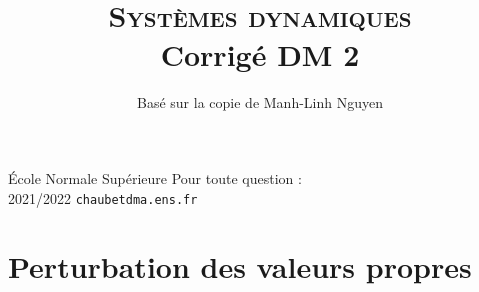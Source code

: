 \documentclass[french, 12pt]{article}
\title{\textsc{Syst\`emes dynamiques} \\Corrig\'e DM 2}
\date{}
\author{\Large Bas\'e sur la copie de Manh-Linh Nguyen}
\theoremstyle{definition}
\begin{document}
{\noindent \'Ecole Normale Sup\'erieure  \hfill Pour toute question :}
\\
{2021/2022 \hfill \hfill \texttt{chaubet\at dma.ens.fr}}

{\let\newpage\relax\maketitle}
\maketitle
	
	
\vspace{0.2 cm}

\section*{Perturbation des valeurs propres}
\end{document}
